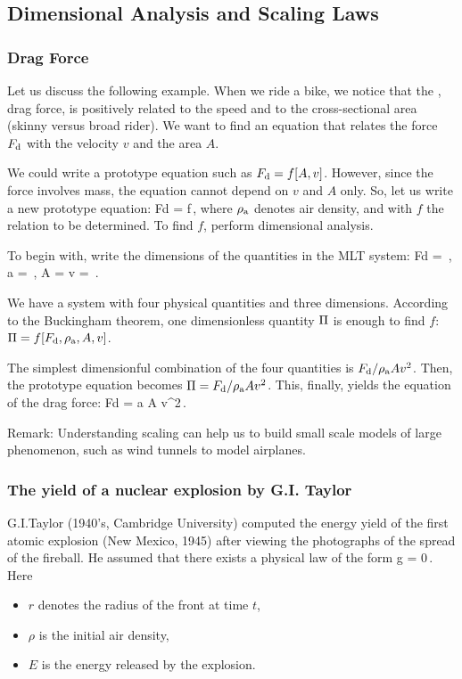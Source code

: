\subsection{Dimensional Analysis and Scaling Laws}

\subsubsection{Drag Force}
Let us discuss the following example. When we ride a bike, we notice that the , \aka drag force, is positively related to the speed and to the cross-sectional area (skinny versus broad rider). We want to find an equation that relates the force $F_\text{d}$ with the velocity $v$ and the area $A$.

We could write a prototype equation such as $F_\text{d} =f\!\left[{A,v}\right]$. However, since the force involves mass, the equation cannot depend on $v$ and $A$ only. So, let us write a new prototype equation:
\beq
F\txt d = f\,,
\eeq
where $\rho_\text{a}$ denotes air density, and with $f$ the relation to be determined. To find $f$, perform dimensional analysis. 

To begin with, write the dimensions of the quantities in the MLT system:
\beq
\dim F\txt d = \,,\quad
\dim \rho\txt a = \,,\quad
\dim A = \quad{}\quad
\dim v = \,.
\eeq

We have a system with four physical quantities and three dimensions. According to the Buckingham theorem, one dimensionless quantity $\Pi$ is enough to find $f$: $\Pi = f\!\left[{F_\text{d}, \rho_\text{a}, A, v}\right]$. 

The simplest dimensionful combination of the four quantities is $F_\text{d}/\rho_\text{a} A v^2$. Then, the prototype equation becomes $\Pi = F_\text{d}/\rho_\text{a} A v^2$. This, finally, yields the equation of the drag force:
\beq
F\txt d = \kdim\rho\txt a A v^2\,.
\eeq

Remark: Understanding scaling can help us to build small scale models of large phenomenon, such as wind tunnels to model airplanes.


\subsubsection{The yield of a nuclear explosion by G.I. Taylor}
G.I.Taylor (1940’s, Cambridge University) computed the energy yield of the first atomic explosion (New Mexico, 1945) after viewing the photographs of the spread of the fireball. He assumed that there exists a physical law of the form
\beq
g = 0\,.
\eeq
Here
\begin{itemize}
\item $r$ denotes the radius of the front at time $t$, 
\item $\rho$ is the initial air density,
\item $E$ is the energy released by the explosion.
\end{itemize}

